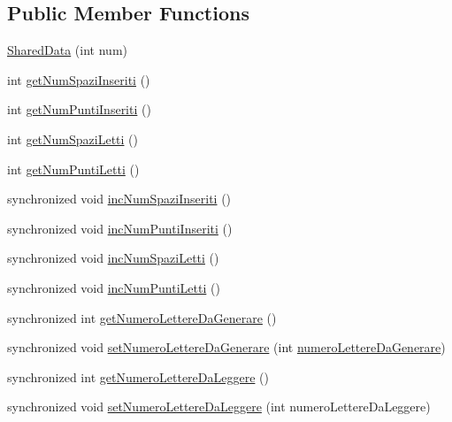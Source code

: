 \subsection*{Public Member Functions}
\begin{DoxyCompactItemize}
\item 
\mbox{\hyperlink{classmain_1_1_shared_data_a7db3c762818109c4adffd587197cc04c}{Shared\+Data}} (int num)
\item 
int \mbox{\hyperlink{classmain_1_1_shared_data_adc76b1379d370fdffb139d532a622360}{get\+Num\+Spazi\+Inseriti}} ()
\item 
int \mbox{\hyperlink{classmain_1_1_shared_data_a605b5ca567b3e27a318d25b422eaf0a8}{get\+Num\+Punti\+Inseriti}} ()
\item 
int \mbox{\hyperlink{classmain_1_1_shared_data_a54eb961c8dee642d24f9e725eb039827}{get\+Num\+Spazi\+Letti}} ()
\item 
int \mbox{\hyperlink{classmain_1_1_shared_data_ada99c4b55a94591cbe74273d43d7171e}{get\+Num\+Punti\+Letti}} ()
\item 
synchronized void \mbox{\hyperlink{classmain_1_1_shared_data_a5d5262bdb021b4f0deab8fefdb4dfe40}{inc\+Num\+Spazi\+Inseriti}} ()
\item 
synchronized void \mbox{\hyperlink{classmain_1_1_shared_data_a34af1e216aea720d07a45ca716b8893b}{inc\+Num\+Punti\+Inseriti}} ()
\item 
synchronized void \mbox{\hyperlink{classmain_1_1_shared_data_a437c60e2bd2e1647fc60ed8ec7f6616e}{inc\+Num\+Spazi\+Letti}} ()
\item 
synchronized void \mbox{\hyperlink{classmain_1_1_shared_data_aa3c9cc591cbe753063e4dd75f20cfade}{inc\+Num\+Punti\+Letti}} ()
\item 
synchronized int \mbox{\hyperlink{classmain_1_1_shared_data_a7400b59cc3ba24fdb82489e16d602c92}{get\+Numero\+Lettere\+Da\+Generare}} ()
\item 
synchronized void \mbox{\hyperlink{classmain_1_1_shared_data_a9f3f5eba6133dccc829f4e67b23cdfae}{set\+Numero\+Lettere\+Da\+Generare}} (int \mbox{\hyperlink{classmain_1_1_shared_data_a45366d93f9e9d909697e5a38c3449a5c}{numero\+Lettere\+Da\+Generare}})
\item 
synchronized int \mbox{\hyperlink{classmain_1_1_shared_data_a560577008f849ccb788cc398fce280d1}{get\+Numero\+Lettere\+Da\+Leggere}} ()
\item 
synchronized void \mbox{\hyperlink{classmain_1_1_shared_data_aac2fca4598933f3179d78fe7857aed55}{set\+Numero\+Lettere\+Da\+Leggere}} (int numero\+Lettere\+Da\+Leggere)

\end{DoxyCompactItemize}
